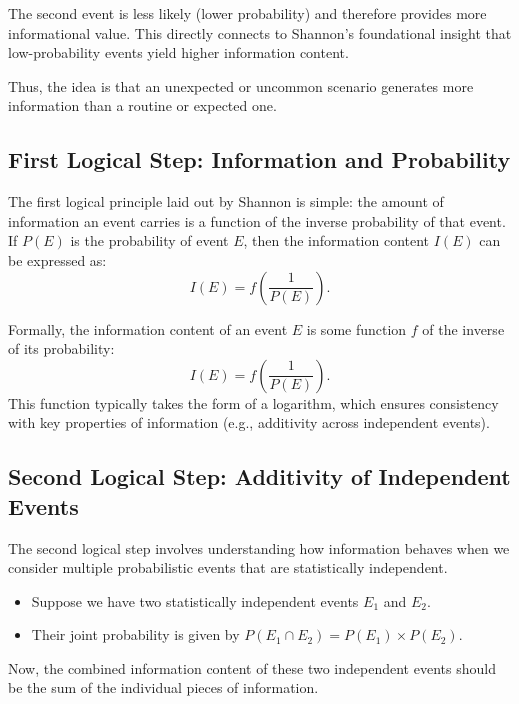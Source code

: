 \documentclass[12pt,a4paper]{article}
\newenvironment{defbox}[1][]{%
  \begin{tcolorbox}[enhanced, breakable, colback=defcolor, colframe=green!50!black, title=#1, fonttitle=\bfseries, arc=3pt, boxrule=0.5pt]
}{\end{tcolorbox}}
\newenvironment{rembox}[1][]{%
  \begin{tcolorbox}[enhanced, breakable, colback=gray!5, colframe=gray!50, title=#1, fonttitle=\bfseries, arc=3pt, boxrule=0.5pt]
}{\end{tcolorbox}}
\begin{document}
\begin{rembox}[Why Uncommon Events Matter]
The second event is less likely (lower probability) and therefore provides more informational value. This directly connects to Shannon's foundational insight that low-probability events yield higher information content.
\end{rembox}

Thus, the idea is that an unexpected or uncommon scenario generates more information than a routine or expected one.

\subsection{First Logical Step: Information and Probability}
The first logical principle laid out by Shannon is simple: the amount of information an event carries is a function of the inverse probability of that event. If $P(E)$ is the probability of event $E$, then the information content $I(E)$ can be expressed as:
\[
I(E) = f\left(\frac{1}{P(E)}\right).
\]

\begin{defbox}[Information as a Function of Probability]
Formally, the information content of an event $E$ is some function $f$ of the inverse of its probability:
\[
I(E) = f\left(\frac{1}{P(E)}\right).
\]
This function typically takes the form of a logarithm, which ensures consistency with key properties of information (e.g., additivity across independent events).
\end{defbox}

\subsection{Second Logical Step: Additivity of Independent Events}
The second logical step involves understanding how information behaves when we consider multiple probabilistic events that are statistically independent.

\begin{itemize}
    \item Suppose we have two statistically independent events $E_1$ and $E_2$.
    \item Their joint probability is given by $P(E_1 \cap E_2) = P(E_1) \times P(E_2)$.
\end{itemize}

Now, the combined information content of these two independent events should be the sum of the individual pieces of information.
\end{document}
